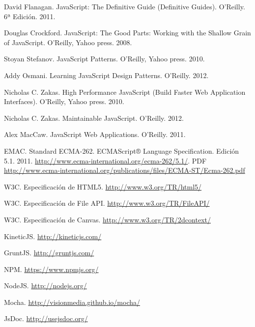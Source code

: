 \newpage


\begin{thebibliography}{50}

 David Flanagan. JavaScript: The Definitive Guide (Definitive Guides). O'Reilly. 6ª Edición. 2011.

 Douglas Crockford. JavaScript: The Good Parts: Working with the Shallow Grain of JavaScript. O'Reilly, Yahoo press. 2008.

 Stoyan Stefanov. JavaScript Patterns. O'Reilly, Yahoo press. 2010.

 Addy Osmani. Learning JavaScript Design Patterns. O'Reilly. 2012.

 Nicholas C. Zakas. High Performance JavaScript (Build Faster Web Application Interfaces). O'Reilly, Yahoo press. 2010.

 Nicholas C. Zakas. Maintainable JavaScript. O'Reilly. 2012.

 Alex MacCaw. JavaScript Web Applications. O'Reilly. 2011.

 EMAC. Standard ECMA-262. ECMAScript® Language Specification. Edición 5.1. 2011. \url{http://www.ecma-international.org/ecma-262/5.1/}. PDF \url{http://www.ecma-international.org/publications/files/ECMA-ST/Ecma-262.pdf}

 W3C. Especificación de HTML5. \url{http://www.w3.org/TR/html5/}

 W3C. Especificación de File API. \url{http://www.w3.org/TR/FileAPI/}

 W3C. Especificación de Canvas. \url{http://www.w3.org/TR/2dcontext/}

 KineticJS. \url{http://kineticjs.com/}

 GruntJS. \url{http://gruntjs.com/}

 NPM. \url{https://www.npmjs.org/}

 NodeJS. \url{http://nodejs.org/}

 Mocha. \url{http://visionmedia.github.io/mocha/}

 JsDoc. \url{http://usejsdoc.org/}


\end{thebibliography}

\newpage